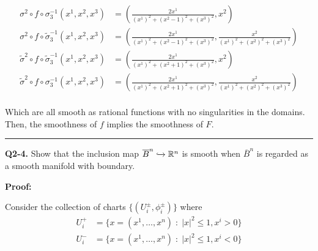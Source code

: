 \documentclass{article}
\newcommand{\R}{\mathbb{R}}
\begin{document}
\begin{enumerate}[label=(\alph*)]
  \[
  \begin{aligned}
  \sigma^2 \circ f \circ \sigma^{-1}_3(x^1, x^2, x^3) &= \left( \frac{2x^1}{(x^1)^2 + (x^2 - 1)^2 + (x^3)^2} , x^2\right) \\
  \sigma^2 \circ f \circ \tilde{\sigma}^{-1}_3(x^1, x^2, x^3) &= \left(\frac{2x^1}{(x^1)^2 + (x^2 - 1)^2 + (x^3)^2}, \frac{x^2}{ (x^1)^2 + (x^2)^2 + (x^3)^2}\right) \\
  \tilde{\sigma}^2 \circ f \circ \tilde{\sigma}^{-1}_3(x^1, x^2, x^3) &= \left( \frac{2x^1}{(x^1)^2 + (x^2 + 1)^2 + (x^3)^2} , x^2\right) \\
  \tilde{\sigma}^2 \circ f \circ \sigma^{-1}_3(x^1, x^2, x^3) &= \left(\frac{2x^1}{(x^1)^2 + (x^2 + 1)^2 + (x^3)^2}, \frac{x^2}{ (x^1)^2 + (x^2)^2 + (x^3)^2}\right) \\
  \end{aligned}
  \]
  
  Which are all smooth as rational functions with no singularities in the domains. Then, the smoothness of $f$ implies the smoothness of $F$. 
\end{enumerate}

\vskip 0.5cm
\hrule 
\vskip 0.5cm

\textbf{Q2-4.} Show that the inclusion map $\overline{B}^n \xhookrightarrow{} \R^n$ is smooth when $\overline{B}^n$ is regarded as a smooth manifold with boundary. 

\vskip 0.5cm
\textbf{Proof:}


\vskip 0.5cm

Consider the collection of charts $\{(U_i^{\pm}, \phi_i^{\pm})\}$ where
\begin{align*}
  U_i^+ &= \{ x = (x^1, \dots, x^n) \;:\; \left|x\right|^2 \leq 1, x^i > 0 \} \\
  U_i^- &= \{ x = (x^1, \dots, x^n) \;:\; \left|x\right|^2 \leq 1, x^i < 0 \} 
\end{align*}
\end{document}
